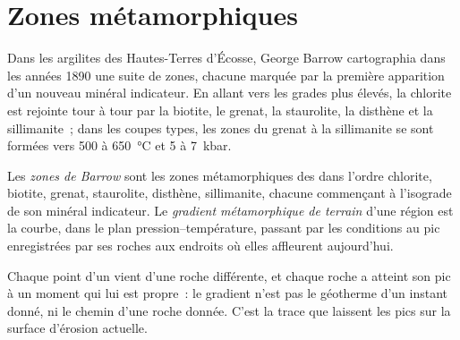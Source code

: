\section{Zones métamorphiques}\label{sec:b2:pt-paths:zones}

Dans les argilites des Hautes-Terres d'Écosse, George Barrow cartographia dans les années 1890 une suite de
zones, chacune marquée par la première apparition d'un nouveau minéral indicateur. En allant vers
les grades plus élevés, la chlorite est rejointe tour à tour par la biotite, le grenat, la staurolite, la disthène et la sillimanite~;
dans les coupes types, les zones du grenat à la sillimanite se sont formées vers 500 à
\qty{650}{\celsius} et 5 à \qty{7}{kbar}.

\begin{definition}\label{def:b2:pt-paths:barrovian}
Les \emph{zones de Barrow} sont les zones métamorphiques des
 dans l'ordre chlorite, biotite, grenat, staurolite, disthène, sillimanite,
chacune commençant à l'isograde de son minéral indicateur. Le \emph{gradient métamorphique
de terrain} d'une région est la courbe, dans le
plan pression--température, passant par les conditions au pic enregistrées par ses roches aux
endroits où elles affleurent aujourd'hui.
\end{definition}

Chaque point d'un  vient d'une roche différente, et chaque roche a atteint son
pic à un moment qui lui est propre~: le gradient n'est pas le géotherme d'un instant donné, ni le
chemin d'une roche donnée. C'est la trace que laissent les pics sur la surface d'érosion actuelle.

